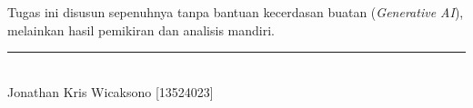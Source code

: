 Tugas ini disusun sepenuhnya tanpa bantuan kecerdasan buatan (\textit{Generative AI}),
melainkan hasil pemikiran dan analisis mandiri.
\begin{flushright}
    \begin{minipage}{0.4\textwidth}
        \centering
        \vspace{2cm}
        \rule{5cm}{0.4pt}\\
        Jonathan Kris Wicaksono [13524023]
    \end{minipage}
\end{flushright}